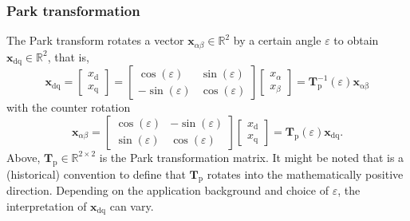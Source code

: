 \begin{frame}
	\frametitle{Park transformation}
	The Park transform rotates a vector $\bm{x}_{\alpha \beta}\in\mathbb{R}^2$ by a certain angle $\varepsilon$ to obtain $\bm{x}_\mathrm{dq}\in\mathbb{R}^2$, that is,
	\begin{equation}
		\renewcommand{\arraystretch}{1.2}
		\bm{x}_{\mathrm{dq}} = \begin{bmatrix} x_\mathrm{d} \\ x_\mathrm{q} \end{bmatrix} = \begin{bmatrix}
			\cos(\varepsilon)  & \sin(\varepsilon) \\
			-\sin(\varepsilon) & \cos(\varepsilon)
		\end{bmatrix} \begin{bmatrix} x_\alpha \\ x_\beta \end{bmatrix} = \bm{T}_\mathrm{p}^{-1}(\varepsilon) \bm{x}_\mathrm{\alpha \beta}
		\label{eq:Park_transformation}
	\end{equation}
	\pause
	with the counter rotation
	\begin{equation}
		\renewcommand{\arraystretch}{1.2}
		\bm{x}_{\alpha \beta} = \begin{bmatrix}
			\cos(\varepsilon) & -\sin(\varepsilon) \\
			\sin(\varepsilon) & \cos(\varepsilon)
		\end{bmatrix} \begin{bmatrix} x_\mathrm{d} \\ x_\mathrm{q} \end{bmatrix} = \bm{T}_\mathrm{p}(\varepsilon) \bm{x}_{\mathrm{dq}}.
	\end{equation}
	\pause
	Above, $\bm{T}_\mathrm{p}\in\mathbb{R}^{2\times 2}$ is the Park transformation matrix. It might be noted that is a (historical) convention to define that $\bm{T}_\mathrm{p}$ rotates into the mathematically positive direction. Depending on the application background and choice of $\varepsilon$, the interpretation of $\bm{x}_\mathrm{dq}$ can vary.
\end{frame}

